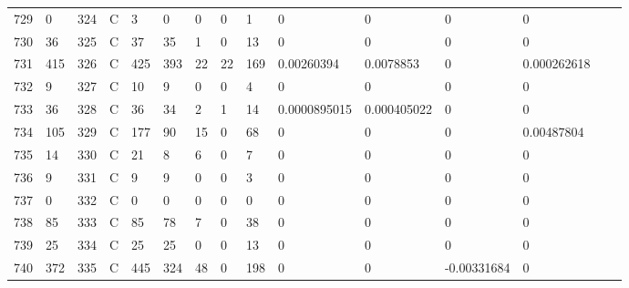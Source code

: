 \begin{longtable}{lllllllllllllll}
	729 & 0                 & 324 & C   & 3                 & 0                 & 0                 & 0    & 1          & 0              & 0              & 0             & 0            \\
	730 & 36                & 325 & C   & 37                & 35                & 1                 & 0    & 13         & 0              & 0              & 0             & 0            \\
	731 & 415               & 326 & C   & 425               & 393               & 22                & 22   & 169        & 0.00260394     & 0.0078853      & 0             & 0.000262618  \\
	732 & 9                 & 327 & C   & 10                & 9                 & 0                 & 0    & 4          & 0              & 0              & 0             & 0            \\
	733 & 36                & 328 & C   & 36                & 34                & 2                 & 1    & 14         & 0.0000895015   & 0.000405022    & 0             & 0            \\
	734 & 105               & 329 & C   & 177               & 90                & 15                & 0    & 68         & 0              & 0              & 0             & 0.00487804   \\
	735 & 14                & 330 & C   & 21                & 8                 & 6                 & 0    & 7          & 0              & 0              & 0             & 0            \\
	736 & 9                 & 331 & C   & 9                 & 9                 & 0                 & 0    & 3          & 0              & 0              & 0             & 0            \\
	737 & 0                 & 332 & C   & 0                 & 0                 & 0                 & 0    & 0          & 0              & 0              & 0             & 0            \\
	738 & 85                & 333 & C   & 85                & 78                & 7                 & 0    & 38         & 0              & 0              & 0             & 0            \\
	739 & 25                & 334 & C   & 25                & 25                & 0                 & 0    & 13         & 0              & 0              & 0             & 0            \\
	740 & 372               & 335 & C   & 445               & 324               & 48                & 0    & 198        & 0              & 0              & -0.00331684   & 0            \\

\end{longtable}
